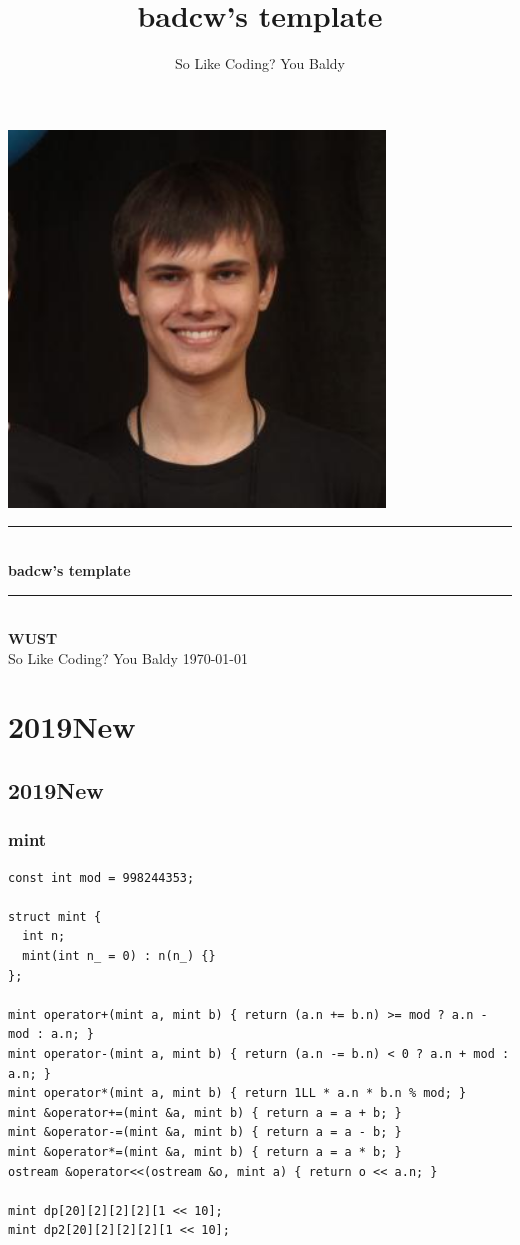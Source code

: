 \documentclass[twoside]{article}
\title{badcw's template}
\author{So Like Coding? You Baldy}
\newcommand{\HRule}{\rule{\linewidth}{0.5mm}}
\begin{document}
\small
\begin{titlepage}
\begin{center}
\vspace*{0.5cm}\includegraphics[width=0.75\textwidth]{logo.jpg} \\ [2cm]
\HRule \\ [1cm]
\textbf{\Huge{badcw's template}} \\ [0.5cm]
\HRule \\ [4cm]
\textbf{\Huge{WUST}} \\ [1cm]
\LARGE{So Like Coding? You Baldy}
\vfill
\Large{\today}
\end{center}
\clearpage
\end{titlepage}
\tableofcontents\clearpage
\pagestyle{fancy}
\lfoot{}
\cfoot{\thepage}\rfoot{}
\setcounter{section}{-1}
\setcounter{page}{1}
\clearpage\section{2019New}
\subsection{2019New}
\subsubsection{mint}
\begin{lstlisting}
const int mod = 998244353;

struct mint {
  int n;
  mint(int n_ = 0) : n(n_) {}
};

mint operator+(mint a, mint b) { return (a.n += b.n) >= mod ? a.n - mod : a.n; }
mint operator-(mint a, mint b) { return (a.n -= b.n) < 0 ? a.n + mod : a.n; }
mint operator*(mint a, mint b) { return 1LL * a.n * b.n % mod; }
mint &operator+=(mint &a, mint b) { return a = a + b; }
mint &operator-=(mint &a, mint b) { return a = a - b; }
mint &operator*=(mint &a, mint b) { return a = a * b; }
ostream &operator<<(ostream &o, mint a) { return o << a.n; }

mint dp[20][2][2][2][1 << 10];
mint dp2[20][2][2][2][1 << 10];\end{lstlisting}
\end{document}
